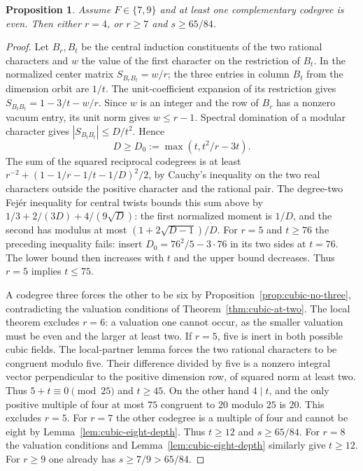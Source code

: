 \documentclass[11pt,a4paper]{article}
\newtheorem{proposition}[theorem]{Proposition}
\numberwithin{equation}{section}
\begin{document}
\begin{proposition}\label{prop:cubic-finite-profiles}
Assume $F\in\{7,9\}$ and at least one complementary codegree is even. Then either $r=4$, or $r\ge7$ and $s\ge65/84$.
\end{proposition}
\begin{proof}
Let $B_r,B_t$ be the central induction constituents of the two rational
characters and $w$ the value of the first character on the restriction
of $B_t$. In the normalized center matrix
$S_{B_r B_t}=w/r$; the three entries in column $B_t$ from the
dimension orbit are $1/t$. The unit-coefficient expansion of its
restriction gives $S_{B_t B_t}=1-3/t-w/r$. Since $w$ is an integer
and the row of $B_r$ has a nonzero vacuum entry, its unit norm gives
$w\le r-1$. Spectral domination of a modular character gives
$|S_{B_t B_t}|\le D/t^2$. Hence
\[
 D\ge D_0:=\max(t,t^2/r-3t).
\]
The sum of the squared reciprocal codegrees is at least
$r^{-2}+(1-1/r-1/t-1/D)^2/2$, by Cauchy's inequality on the two real
characters outside the positive character and the rational pair. The
degree-two Fej\'er inequality for central twists bounds this sum above
by $1/3+2/(3D)+4/(9\sqrt D)$: the first normalized moment is $1/D$,
and the second has modulus at most $(1+2\sqrt{D-1})/D$.
For $r=5$ and $t\ge76$ the preceding inequality fails: insert $D_0=76^2/5-3\cdot76$ in its two sides at $t=76$. The lower bound then increases with $t$ and the upper bound decreases. Thus $r=5$ implies $t\le75$.

A codegree three forces the other to be six by Proposition~\ref{prop:cubic-no-three}, contradicting the valuation conditions of Theorem~\ref{thm:cubic-at-two}.
The local theorem excludes $r=6$: a valuation one cannot occur, as the
smaller valuation must be even and the larger at least two.
If $r=5$, five is inert in both possible cubic fields. The
local-partner lemma forces the two rational characters to be congruent
modulo five. Their difference divided by five is a nonzero integral
vector perpendicular to the positive dimension row, of squared norm at
least two. Thus $5+t\equiv0\pmod{25}$ and $t\ge45$. On the other hand
$4\mid t$, and the only positive multiple of four at most $75$
congruent to $20$ modulo $25$ is $20$. This excludes $r=5$.
For $r=7$ the other codegree is a multiple of four and cannot be eight by Lemma~\ref{lem:cubic-eight-depth}. Thus $t\ge12$ and $s\ge65/84$. For $r=8$ the valuation conditions and Lemma~\ref{lem:cubic-eight-depth} similarly give $t\ge12$. For $r\ge9$ one already has $s\ge7/9>65/84$.
\end{proof}
\end{document}
